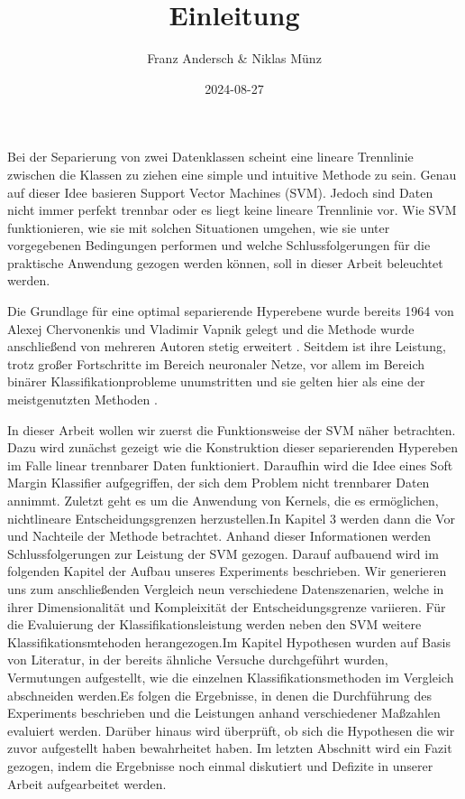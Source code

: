 \documentclass[
]{article}
\title{Einleitung}
\author{Franz Andersch \& Niklas Münz}
\date{2024-08-27}
\renewcommand{\maketitle}{}
\begin{document}
\maketitle

Bei der Separierung von zwei Datenklassen scheint eine lineare
Trennlinie zwischen die Klassen zu ziehen eine simple und intuitive
Methode zu sein. Genau auf dieser Idee basieren Support Vector Machines
(SVM). Jedoch sind Daten nicht immer perfekt trennbar oder es liegt
keine lineare Trennlinie vor. Wie SVM funktionieren, wie sie mit solchen
Situationen umgehen, wie sie unter vorgegebenen Bedingungen performen
und welche Schlussfolgerungen für die praktische Anwendung gezogen
werden können, soll in dieser Arbeit beleuchtet werden.

Die Grundlage für eine optimal separierende Hyperebene wurde bereits
1964 von Alexej Chervonenkis und Vladimir Vapnik gelegt und die Methode
wurde anschließend von mehreren Autoren stetig erweitert
\parencite{vapnikEstimationDependencesBased2006}. Seitdem ist ihre
Leistung, trotz großer Fortschritte im Bereich neuronaler Netze, vor
allem im Bereich binärer Klassifikationprobleme unumstritten und sie
gelten hier als eine der meistgenutzten Methoden
\parencite{soofiClassificationTechniquesMachine2017}.

In dieser Arbeit wollen wir zuerst die Funktionsweise der SVM näher
betrachten. Dazu wird zunächst gezeigt wie die Konstruktion dieser
separierenden Hypereben im Falle linear trennbarer Daten funktioniert.
Daraufhin wird die Idee eines Soft Margin Klassifier aufgegriffen, der
sich dem Problem nicht trennbarer Daten annimmt. Zuletzt geht es um die
Anwendung von Kernels, die es ermöglichen, nichtlineare
Entscheidungsgrenzen herzustellen.\newline In Kapitel 3 werden dann die
Vor und Nachteile der Methode betrachtet. Anhand dieser Informationen
werden Schlussfolgerungen zur Leistung der SVM gezogen. Darauf aufbauend
wird im folgenden Kapitel der Aufbau unseres Experiments beschrieben.
Wir generieren uns zum anschließenden Vergleich neun verschiedene
Datenszenarien, welche in ihrer Dimensionalität und Kompleixität der
Entscheidungsgrenze variieren. Für die Evaluierung der
Klassifikationsleistung werden neben den SVM weitere
Klassifikationsmtehoden herangezogen.\newline Im Kapitel Hypothesen
wurden auf Basis von Literatur, in der bereits ähnliche Versuche
durchgeführt wurden, Vermutungen aufgestellt, wie die einzelnen
Klassifikationsmethoden im Vergleich abschneiden werden.\newline Es
folgen die Ergebnisse, in denen die Durchführung des Experiments
beschrieben und die Leistungen anhand verschiedener Maßzahlen evaluiert
werden. Darüber hinaus wird überprüft, ob sich die Hypothesen die wir
zuvor aufgestellt haben bewahrheitet haben. Im letzten Abschnitt wird
ein Fazit gezogen, indem die Ergebnisse noch einmal diskutiert und
Defizite in unserer Arbeit aufgearbeitet werden.

\printbibliography
\end{document}
